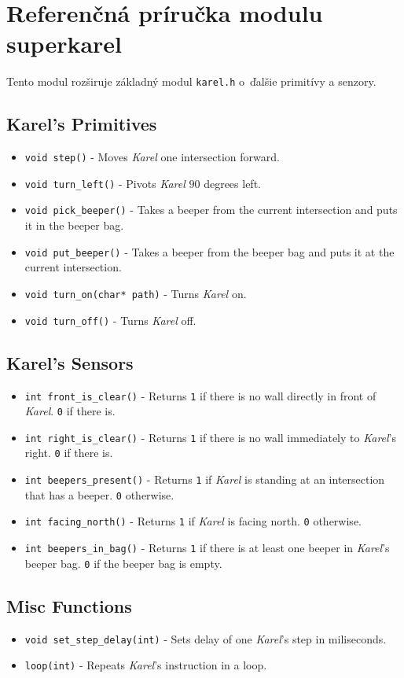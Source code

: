 
\chapter{Referenčná príručka modulu superkarel}\label{app:superkarel}


Tento modul rozširuje základný modul \verb|karel.h| o~ďalšie primitívy a senzory.


\section*{Karel's Primitives}

\begin{itemize}
    \item \verb|void step()| - Moves \textit{Karel} one intersection forward.
    \item \verb|void turn_left()| - Pivots \textit{Karel} $90$ degrees left.
    \item \verb|void pick_beeper()| - Takes a beeper from the current intersection and puts it in the beeper bag.
    \item \verb|void put_beeper()| - Takes a beeper from the beeper bag and puts it at the current intersection.
    \item \verb|void turn_on(char* path)| - Turns \textit{Karel} on.
    \item \verb|void turn_off()| - Turns \textit{Karel} off.
\end{itemize}


\section*{Karel's Sensors}

\begin{itemize}
    \item \verb|int front_is_clear()| - Returns \texttt{1} if there is no wall directly in front of \textit{Karel}. \texttt{0} if there is.
    \item \verb|int right_is_clear()| - Returns \texttt{1} if there is no wall immediately to \textit{Karel}'s right. \texttt{0} if there is.
    \item \verb|int beepers_present()| - Returns \texttt{1} if \textit{Karel} is standing at an intersection that has a beeper. \texttt{0} otherwise.
    \item \verb|int facing_north()| - Returns \texttt{1} if \textit{Karel} is facing north. \texttt{0} otherwise.
    \item \verb|int beepers_in_bag()| - Returns \texttt{1} if there is at least one beeper in \textit{Karel}'s beeper bag. \texttt{0} if the beeper bag is empty.
\end{itemize}


\section*{Misc Functions}

\begin{itemize}
    \item \verb|void set_step_delay(int)| - Sets delay of one \textit{Karel}'s step in miliseconds.
    \item \verb|loop(int)| - Repeats \textit{Karel}'s instruction in a loop.
\end{itemize}
